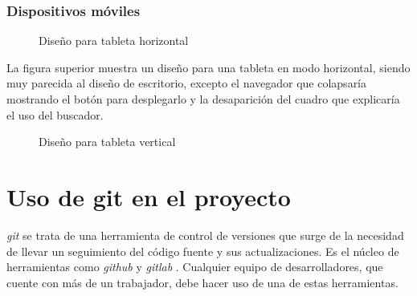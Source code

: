 \begin{enumerate}
\subsubsection{Dispositivos móviles}
\begin{figure}[h!]
\centering
{}
\caption{Diseño para tableta horizontal}
\label{fig:surface}
\end{figure}
La figura superior muestra un diseño para una tableta en modo horizontal, siendo muy parecida al diseño de escritorio, excepto el navegador que colapsaría mostrando el botón para desplegarlo y la desaparición del cuadro que explicaría el uso del buscador.

\begin{figure}[h!]
\centering
{}
\caption{Diseño para tableta vertical}
\label{fig:ipad}
\end{figure}

\newpage
\section{Uso de git en el proyecto}
\emph{\Gls{git}} se trata de una herramienta de control de versiones que surge de la necesidad de llevar un seguimiento del código fuente y sus actualizaciones. Es el núcleo de herramientas como \emph{\Gls{github}}  y \emph{\Gls{gitlab}} . Cualquier equipo de desarrolladores, que cuente con más de un trabajador, debe hacer uso de una de estas herramientas.


\end{enumerate}
